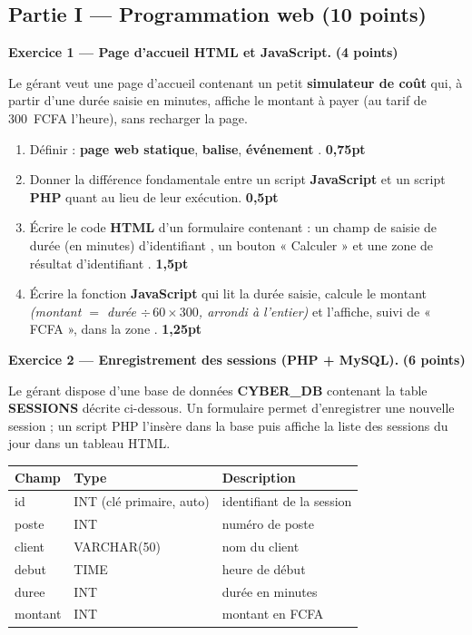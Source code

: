 \subsection*{Partie I — Programmation web \hfill (10 points)}

\textbf{Exercice 1 — Page d'accueil HTML et JavaScript.} \hfill \textbf{(4 points)}

\smallskip
Le gérant veut une page d'accueil contenant un petit \textbf{simulateur de coût}
qui, à partir d'une durée saisie en minutes, affiche le montant à payer (au tarif
de 300~FCFA l'heure), sans recharger la page.

\begin{enumerate}[label=\textbf{\arabic*-},leftmargin=2.2em]
\item Définir : \textbf{page web statique}, \textbf{balise}, \textbf{événement
}. \hfill \textbf{0,75pt}
\item Donner la différence fondamentale entre un script \textbf{JavaScript} et un
script \textbf{PHP} quant au lieu de leur exécution. \hfill \textbf{0,5pt}
\item Écrire le code \textbf{HTML} d'un formulaire contenant : un champ de saisie
de durée (en minutes) d'identifiant , un bouton « Calculer » et une
zone de résultat d'identifiant . \hfill \textbf{1,5pt}
\item Écrire la fonction \textbf{JavaScript}  qui lit la
durée saisie, calcule le montant \emph{(montant $=$ durée $\div\,60 \times 300$,
arrondi à l'entier)} et l'affiche, suivi de « FCFA », dans la zone
. \hfill \textbf{1,25pt}
\end{enumerate}

\bigskip
\textbf{Exercice 2 — Enregistrement des sessions (PHP + MySQL).} \hfill \textbf{(6 points)}

\smallskip
Le gérant dispose d'une base de données \textbf{CYBER\_DB} contenant la table
\textbf{SESSIONS} décrite ci-dessous. Un formulaire permet d'enregistrer une
nouvelle session ; un script PHP l'insère dans la base puis affiche la liste des
sessions du jour dans un tableau HTML.

\begin{center}\small
\begin{tabular}{@{}|l|l|l|@{}}
\hline
\textbf{Champ} & \textbf{Type} & \textbf{Description}\\
\hline
id        & INT (clé primaire, auto) & identifiant de la session\\
poste     & INT          & numéro de poste\\
client    & VARCHAR(50)  & nom du client\\
debut     & TIME         & heure de début\\
duree     & INT          & durée en minutes\\
montant   & INT          & montant en FCFA\\
\hline
\end{tabular}
\end{center}

